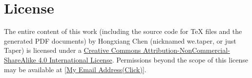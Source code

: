 \documentclass{article}
\begin{document}
\section{License}
The entire content of this work (including the source code
for TeX files and the generated PDF documents) by 
Hongxiang Chen (nicknamed we.taper, or just Taper) is
licensed under a 
\href{http://creativecommons.org/licenses/by-nc-sa/4.0/}{Creative 
Commons Attribution-NonCommercial-ShareAlike 4.0 International 
License}. Permissions beyond the scope of this 
license may be available at 
\href{http://www.google.com/recaptcha/mailhide/d?k=015LguzBJigi0rpyuJRqLoig==\&c=p1c-M-mm7ZcjUCkTuZZa9eEPHRVk6paN0694iazlQy8=}
{[My Email Address(Click)]}.

{}

\printnomenclature
\end{document}
